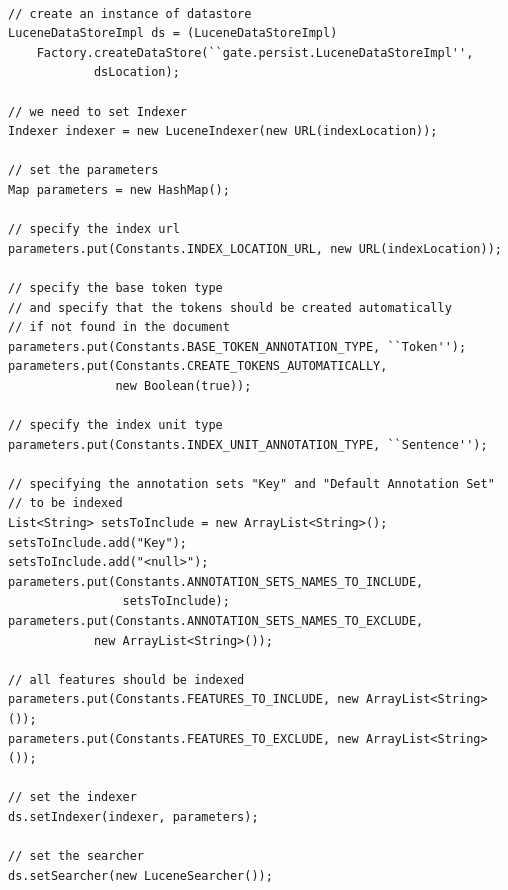 \begin{lstlisting}

// create an instance of datastore
LuceneDataStoreImpl ds = (LuceneDataStoreImpl) 
	Factory.createDataStore(``gate.persist.LuceneDataStoreImpl'',
	        dsLocation);

// we need to set Indexer
Indexer indexer = new LuceneIndexer(new URL(indexLocation));

// set the parameters
Map parameters = new HashMap();

// specify the index url
parameters.put(Constants.INDEX_LOCATION_URL, new URL(indexLocation));

// specify the base token type
// and specify that the tokens should be created automatically
// if not found in the document
parameters.put(Constants.BASE_TOKEN_ANNOTATION_TYPE, ``Token'');
parameters.put(Constants.CREATE_TOKENS_AUTOMATICALLY, 
               new Boolean(true));

// specify the index unit type
parameters.put(Constants.INDEX_UNIT_ANNOTATION_TYPE, ``Sentence'');

// specifying the annotation sets "Key" and "Default Annotation Set"
// to be indexed
List<String> setsToInclude = new ArrayList<String>();
setsToInclude.add("Key");
setsToInclude.add("<null>");
parameters.put(Constants.ANNOTATION_SETS_NAMES_TO_INCLUDE, 
                setsToInclude);
parameters.put(Constants.ANNOTATION_SETS_NAMES_TO_EXCLUDE,
	        new ArrayList<String>());

// all features should be indexed
parameters.put(Constants.FEATURES_TO_INCLUDE, new ArrayList<String>());
parameters.put(Constants.FEATURES_TO_EXCLUDE, new ArrayList<String>());

// set the indexer
ds.setIndexer(indexer, parameters);

// set the searcher
ds.setSearcher(new LuceneSearcher());

\end{lstlisting}


